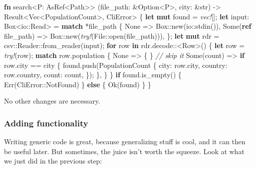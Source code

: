 \documentclass[a4paper,]{book}
\newenvironment{Shaded}{\begin{snugshade}}{\end{snugshade}}
\newcommand{\KeywordTok}[1]{\textcolor[rgb]{0.13,0.29,0.53}{\textbf{{#1}}}}
\newcommand{\DataTypeTok}[1]{\textcolor[rgb]{0.13,0.29,0.53}{{#1}}}
\newcommand{\ConstantTok}[1]{\textcolor[rgb]{0.00,0.00,0.00}{{#1}}}
\newcommand{\CommentTok}[1]{\textcolor[rgb]{0.56,0.35,0.01}{\textit{{#1}}}}
\newcommand{\PreprocessorTok}[1]{\textcolor[rgb]{0.56,0.35,0.01}{\textit{{#1}}}}
\newcommand{\NormalTok}[1]{{#1}}
\begin{document}
\begin{Shaded}
\begin{Highlighting}[]
\KeywordTok{fn} \NormalTok{search<P: AsRef<Path>>}
         \NormalTok{(file_path: &}\DataTypeTok{Option}\NormalTok{<P>, city: &}\DataTypeTok{str}\NormalTok{)}
         \NormalTok{-> }\DataTypeTok{Result}\NormalTok{<}\DataTypeTok{Vec}\NormalTok{<PopulationCount>, CliError> \{}
    \KeywordTok{let} \KeywordTok{mut} \NormalTok{found = }\PreprocessorTok{vec!}\NormalTok{[];}
    \KeywordTok{let} \NormalTok{input: }\DataTypeTok{Box}\NormalTok{<io::Read> = }\KeywordTok{match} \NormalTok{*file_path \{}
        \ConstantTok{None} \NormalTok{=> }\DataTypeTok{Box}\NormalTok{::new(io::stdin()),}
        \ConstantTok{Some}\NormalTok{(}\KeywordTok{ref} \NormalTok{file_path) => }\DataTypeTok{Box}\NormalTok{::new(}\PreprocessorTok{try!}\NormalTok{(File::open(file_path))),}
    \NormalTok{\};}
    \KeywordTok{let} \KeywordTok{mut} \NormalTok{rdr = csv::Reader::from_reader(input);}
    \KeywordTok{for} \NormalTok{row }\KeywordTok{in} \NormalTok{rdr.decode::<Row>() \{}
        \KeywordTok{let} \NormalTok{row = }\PreprocessorTok{try!}\NormalTok{(row);}
        \KeywordTok{match} \NormalTok{row.population \{}
            \ConstantTok{None} \NormalTok{=> \{ \} }\CommentTok{// skip it}
            \ConstantTok{Some}\NormalTok{(count) => }\KeywordTok{if} \NormalTok{row.city == city \{}
                \NormalTok{found.push(PopulationCount \{}
                    \NormalTok{city: row.city,}
                    \NormalTok{country: row.country,}
                    \NormalTok{count: count,}
                \NormalTok{\});}
            \NormalTok{\},}
        \NormalTok{\}}
    \NormalTok{\}}
    \KeywordTok{if} \NormalTok{found.is_empty() \{}
        \ConstantTok{Err}\NormalTok{(CliError::NotFound)}
    \NormalTok{\} }\KeywordTok{else} \NormalTok{\{}
        \ConstantTok{Ok}\NormalTok{(found)}
    \NormalTok{\}}
\NormalTok{\}}
\end{Highlighting}
\end{Shaded}

No other changes are necessary.

\hypertarget{adding-functionality}{\subsubsection{Adding
functionality}\label{adding-functionality}}

Writing generic code is great, because generalizing stuff is cool, and
it can then be useful later. But sometimes, the juice isn't worth the
squeeze. Look at what we just did in the previous step:
\end{document}
